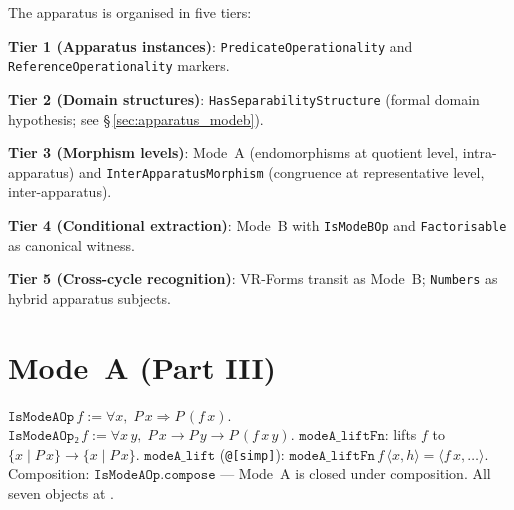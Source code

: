 \begin{definition}
\label{def:five_tier}
\leanok
{}
The apparatus is organised in five tiers:

\textbf{Tier 1 (Apparatus instances)}: \texttt{PredicateOperationality}
and \texttt{ReferenceOperationality} markers.

\textbf{Tier 2 (Domain structures)}: \texttt{HasSeparabilityStructure}
(formal domain hypothesis; see \S\,\ref{sec:apparatus_modeb}).

\textbf{Tier 3 (Morphism levels)}: Mode~A (endomorphisms at quotient
level, intra-apparatus) and \texttt{InterApparatusMorphism} (congruence
at representative level, inter-apparatus).

\textbf{Tier 4 (Conditional extraction)}: Mode~B with \texttt{IsModeBOp}
and \texttt{Factorisable} as canonical witness.

\textbf{Tier 5 (Cross-cycle recognition)}: VR-Forms transit as Mode~B;
\texttt{Numbers} as hybrid apparatus subjects.
\end{definition}

\section{Mode~A (Part III)}
\label{sec:apparatus_modeA}

\begin{definition}
\label{def:IsModeAOp_pred}
\leanok
{}
$\texttt{IsModeAOp}\,f := \forall x,\; P\,x \Rightarrow P\,(f\,x)$.
$\texttt{IsModeAOp₂}\,f := \forall x\,y,\; P\,x \to P\,y \to P\,(f\,x\,y)$.
$\texttt{modeA\_liftFn}$: lifts $f$ to $\{x \mid P\,x\} \to \{x \mid P\,x\}$.
$\texttt{modeA\_lift}$ (\texttt{@[simp]}): $\texttt{modeA\_liftFn}\,f\,\langle x, h\rangle =
\langle f\,x, \ldots\rangle$.
Composition: $\texttt{IsModeAOp.compose}$ --- Mode~A is closed under composition.
All seven objects at \axiomprofile{[]}.
\end{definition}

